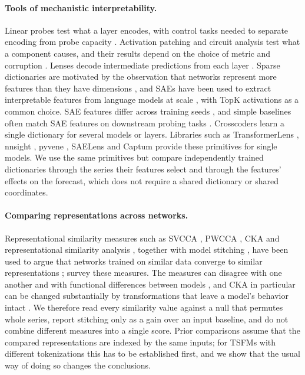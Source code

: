 \documentclass[twoside,11pt]{article}
\begin{document}
\paragraph{Tools of mechanistic interpretability.}
Linear probes \citep{alain2017probes} test what a layer encodes, with control tasks needed to separate encoding from probe capacity \citep{hewitt2019control,belinkov2022probing}.
Activation patching \citep{vig2020causal,meng2022rome} and circuit analysis \citep{olah2020zoom,wang2023ioi} test what a component causes, and their results depend on the choice of metric and corruption \citep{zhang2024patching,heimersheim2024patching}.
Lenses decode intermediate predictions from each layer \citep{nostalgebraist2020logitlens,belrose2023tuned}.
Sparse dictionaries are motivated by the observation that networks represent more features than they have dimensions \citep{elhage2022superposition}, and SAEs have been used to extract interpretable features from language models at scale \citep{bricken2023monosemanticity,cunningham2024sae,templeton2024scaling}, with TopK activations \citep{makhzani2013ksparse,gao2025topk} as a common choice.
SAE features differ across training seeds \citep{paulo2025seeds}, and simple baselines often match SAE features on downstream probing tasks \citep{kantamneni2025sparse}.
Crosscoders \citep{lindsey2024crosscoders} learn a single dictionary for several models or layers.
Libraries such as TransformerLens \citep{nanda2022transformerlens}, nnsight \citep{fiottokaufman2025nnsight}, pyvene \citep{wu2024pyvene}, SAELens \citep{bloom2024saelens} and Captum \citep{kokhlikyan2020captum} provide these primitives for single models.
We use the same primitives but compare independently trained dictionaries through the series their features select and through the features' effects on the forecast, which does not require a shared dictionary or shared coordinates.

\paragraph{Comparing representations across networks.}
Representational similarity measures such as SVCCA \citep{raghu2017svcca}, PWCCA \citep{morcos2018pwcca}, CKA \citep{kornblith2019cka} and representational similarity analysis \citep{kriegeskorte2008rsa}, together with model stitching \citep{lenc2015equivariance,bansal2021stitching}, have been used to argue that networks trained on similar data converge to similar representations \citep{li2016convergent,huh2024platonic}; \citet{klabunde2025similarity} survey these measures.
The measures can disagree with one another and with functional differences between models \citep{ding2021grounding}, and CKA in particular can be changed substantially by transformations that leave a model's behavior intact \citep{davari2023cka}.
We therefore read every similarity value against a null that permutes whole series, report stitching only as a gain over an input baseline, and do not combine different measures into a single score.
Prior comparisons assume that the compared representations are indexed by the same inputs; for TSFMs with different tokenizations this has to be established first, and we show that the usual way of doing so changes the conclusions.
\end{document}
